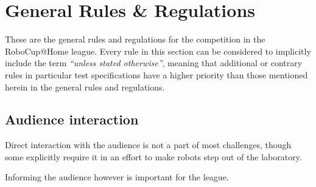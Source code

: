 \chapter{General Rules \& Regulations}
\label{chap:rules}

These are the general rules and regulations for the competition in the RoboCup@Home league.
Every rule in this section can be considered to implicitly include the term \emph{\enquote{unless stated otherwise}}, meaning that additional or contrary rules in particular
test specifications have a higher priority than those mentioned herein in the general rules and regulations.



\section{Audience interaction}
Direct interaction with the audience is not a part of most challenges, though some explicitly require it in an effort to make robots step out of the laboratory.

Informing the audience however is important for the league.





















